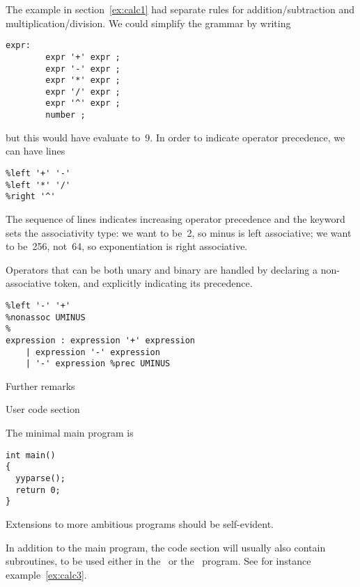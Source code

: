 The example in section~\ref{ex:calc1} had separate rules for
addition/subtraction and multiplication/division. We could simplify
the grammar by writing
\begin{verbatim}
expr:
        expr '+' expr ;
        expr '-' expr ;
        expr '*' expr ;
        expr '/' expr ;
        expr '^' expr ;
        number ;
\end{verbatim}
but this would have  evaluate to~9. In order to indicate
operator precedence, we can have lines
\begin{verbatim}
%left '+' '-'
%left '*' '/'
%right '^'
\end{verbatim}
The sequence of lines indicates increasing operator precedence and the
keyword sets the associativity type: we want  to be~2, so
minus is left associative; we want  to be~256, not~64, so
exponentiation is right associative.

Operators that can be both unary and binary are handled by declaring a
non-associative token, and explicitly indicating its precedence.
\begin{verbatim}
%left '-' '+'
%nonassoc UMINUS
%
expression : expression '+' expression
    | expression '-' expression
    | '-' expression %prec UMINUS
\end{verbatim}

 {Further remarks}

 {User code section}

The minimal main program is
\begin{verbatim}
int main()
{
  yyparse();
  return 0;
}
\end{verbatim}
Extensions to more ambitious programs should be self-evident.

In addition to the main program, the code section will usually also
contain subroutines, to be used either in the \yacc\ or the
\lex\ program. See for instance example~\ref{ex:calc3}.

